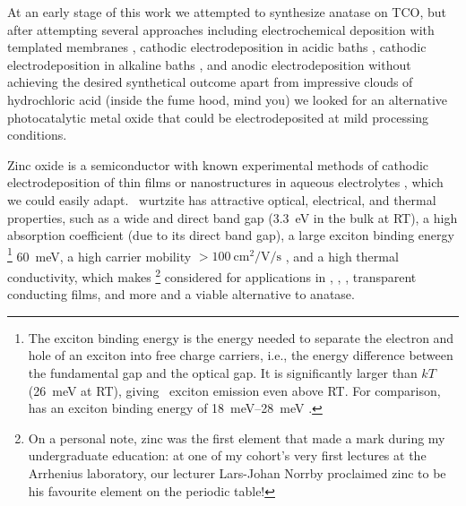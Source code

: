 \documentclass[webedition,openright,titles,swedish,english]{LuaUUThesis}\usepackage[]{graphicx}\usepackage[]{xcolor}
\newcommand{\ie}{i.e.}
\begin{document}
At an early stage of this work we attempted to synthesize anatase 
 on \gls{TCO}, but after attempting several approaches
including
electrochemical deposition with templated membranes
\cite{Limmer2001,Limmer2002,Chu2003,Chu2003b,Limmer2003a,
Limmer2004,Chu2004,Limmer2005,Yan2006},
cathodic electrodeposition in acidic baths
\cite{Natarajan1996,Karuppuchamy2001,Chenthamarakshan2002,Karuppuchamy2002,
deTacconi2003,deTacconi2004,deTacconi2005,Karuppuchamy2005,Karuppuchamy2006,
Karuppuchamy2006a,Somasundaram2006,Karuppuchamy2007,Chettah2008,Chigane2009,
Zhou2009,Chen2010h,Elhajj2010},
cathodic electrodeposition in alkaline baths
\cite{Ohya2002,Sawatani2005,Wessels2008,Wessels2008a}, and
anodic electrodeposition
\cite{Flood1995,Lokhande2005,Wessels2006,Tsai2009,Wu2009b,Wessels2010,Wu2011}
without achieving the desired synthetical outcome apart from
impressive clouds of hydrochloric acid (inside the fume hood, mind you) we looked
for an alternative photocatalytic metal oxide that could be electrodeposited
at mild processing conditions.

Zinc oxide is a semiconductor with known experimental methods of cathodic electrodeposition
of thin films or nanostructures in aqueous electrolytes \cite{Peulon1998,Pauporte2009},
which we could easily adapt.
\ZnO\ wurtzite has attractive optical, electrical, and thermal properties, such as
a wide and direct band gap (\qty{3.3}{\eV} in the bulk at \gls{RT}),
a high absorption coefficient (due to its direct band gap),
a large exciton binding energy%
\footnote{%
   The exciton binding energy is the energy needed to separate the electron and hole
   of an exciton into free charge carriers, \ie, the energy difference between the
   fundamental gap and the optical gap.
   It is significantly larger than $kT$ (\qty{26}{\milli\eV} at \gls{RT}), giving
   \ZnO\ exciton emission even above \gls{RT}.
   For comparison,  has an exciton binding energy of \qtyrange{18}{28}{\meV} \cite{Karpina2004}.
   }
\qty{60}{\milli\eV},
a high carrier mobility $>\qty{100}{\cm\squared\per\volt\per\second}$ \cite{Janotti2009},
and a high thermal conductivity,
which makes \ZnO%
\footnote{%
   On a personal note, zinc was the first element that made a mark
   during my undergraduate education: at one of my cohort's very
   first lectures at the Arrhenius laboratory, our lecturer
   Lars-Johan Norrby proclaimed zinc to be his favourite element on the periodic table!}
considered for applications in ,
, , transparent conducting films, and more
and a viable alternative to  anatase.
\end{document}
